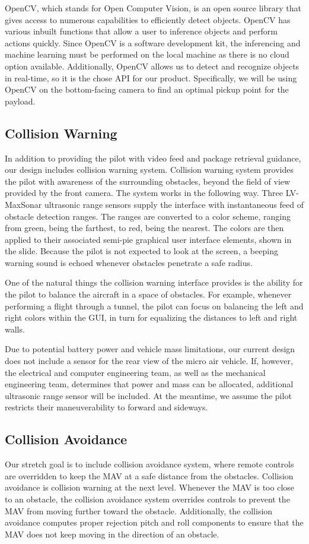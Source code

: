\documentclass[onecolumn, oneside, letterpaper, draftclsnofoot, 10pt, compsoc]{IEEEtran}
\begin{document}
\noindent
OpenCV, which stands for Open Computer Vision, is an open source library that gives access to numerous capabilities to efficiently detect objects. OpenCV has various inbuilt functions that allow a user to inference objects and perform actions quickly. Since OpenCV is a software development kit, the inferencing and machine learning must be performed on the local machine as there is no cloud option available. Additionally, OpenCV allows us to detect and recognize objects in real-time, so it is the chose API for our product. Specifically, we will be using OpenCV on the bottom-facing camera to find an optimal pickup point for the payload.

\subsection{Collision Warning}
In addition to providing the pilot with video feed and package retrieval guidance, our design includes collision warning system. Collision warning system provides the pilot with awareness of the surrounding obstacles, beyond the field of view provided by the front camera. The system works in the following way. Three LV-MaxSonar ultrasonic range sensors supply the interface with instantaneous feed of obstacle detection ranges. The ranges are converted to a color scheme, ranging from green, being the farthest, to red, being the nearest. The colors are then applied to their associated semi-pie graphical user interface elements, shown in the slide. Because the pilot is not expected to look at the screen, a beeping warning sound is echoed whenever obstacles penetrate a safe radius.

One of the natural things the collision warning interface provides is the ability for the pilot to balance the aircraft in a space of obstacles. For example, whenever performing a flight through a tunnel, the pilot can focus on balancing the left and right colors within the GUI, in turn for equalizing the distances to left and right walls.

Due to potential battery power and vehicle mass limitations, our current design does not include a sensor for the rear view of the micro air vehicle. If, however, the electrical and computer engineering team, as well as the mechanical engineering team, determines that power and mass can be allocated, additional ultrasonic range sensor will be included. At the meantime, we assume the pilot restricts their maneuverability to forward and sideways.

\subsection{Collision Avoidance}
Our stretch goal is to include collision avoidance system, where remote controls are overridden to keep the MAV at a safe distance from the obstacles. Collision avoidance is collision warning at the next level. Whenever the MAV is too close to an obstacle, the collision avoidance system overrides controls to prevent the MAV from moving further toward the obstacle. Additionally, the collision avoidance computes proper rejection pitch and roll components to ensure that the MAV does not keep moving in the direction of an obstacle.
\end{document}
